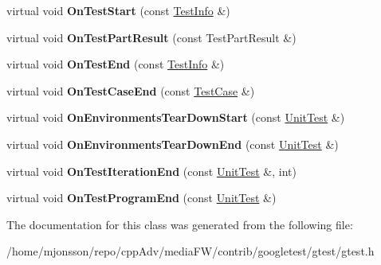 \begin{DoxyCompactItemize}
\item 
\mbox{\label{classtesting_1_1EmptyTestEventListener_a84fa74cc9ba742f9f847ea405ca84e5e}} 
virtual void {\bfseries On\+Test\+Start} (const \hyperlink{classtesting_1_1TestInfo}{Test\+Info} \&)
\item 
\mbox{\label{classtesting_1_1EmptyTestEventListener_a59e7f7d9f2e2d089a6e8c1e2577f4718}} 
virtual void {\bfseries On\+Test\+Part\+Result} (const Test\+Part\+Result \&)
\item 
\mbox{\label{classtesting_1_1EmptyTestEventListener_afd58d21005f0d0d0399fb114627545d3}} 
virtual void {\bfseries On\+Test\+End} (const \hyperlink{classtesting_1_1TestInfo}{Test\+Info} \&)
\item 
\mbox{\label{classtesting_1_1EmptyTestEventListener_a6bec703158283104c4298f7d8a528515}} 
virtual void {\bfseries On\+Test\+Case\+End} (const \hyperlink{classtesting_1_1TestCase}{Test\+Case} \&)
\item 
\mbox{\label{classtesting_1_1EmptyTestEventListener_a00fa1a4ea5831e20746188414268e7c6}} 
virtual void {\bfseries On\+Environments\+Tear\+Down\+Start} (const \hyperlink{classtesting_1_1UnitTest}{Unit\+Test} \&)
\item 
\mbox{\label{classtesting_1_1EmptyTestEventListener_aea64c83c415b33a4c0b0239bafd1438d}} 
virtual void {\bfseries On\+Environments\+Tear\+Down\+End} (const \hyperlink{classtesting_1_1UnitTest}{Unit\+Test} \&)
\item 
\mbox{\label{classtesting_1_1EmptyTestEventListener_a2253e5a18b3cf7bccd349567a252209d}} 
virtual void {\bfseries On\+Test\+Iteration\+End} (const \hyperlink{classtesting_1_1UnitTest}{Unit\+Test} \&, int)
\item 
\mbox{\label{classtesting_1_1EmptyTestEventListener_a0abcc02bd2331a2e29ad6f4d9daf2a32}} 
virtual void {\bfseries On\+Test\+Program\+End} (const \hyperlink{classtesting_1_1UnitTest}{Unit\+Test} \&)
\end{DoxyCompactItemize}


The documentation for this class was generated from the following file\+:\begin{DoxyCompactItemize}
\item 
/home/mjonsson/repo/cpp\+Adv/media\+F\+W/contrib/googletest/gtest/gtest.\+h\end{DoxyCompactItemize}
